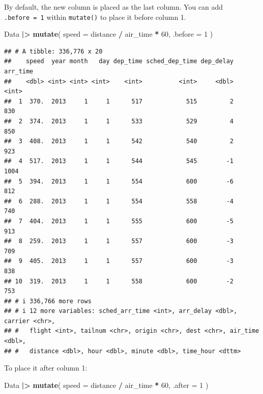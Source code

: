 \documentclass[
]{book}
\newenvironment{Shaded}{\begin{snugshade}}{\end{snugshade}}
\newcommand{\AttributeTok}[1]{\textcolor[rgb]{0.13,0.29,0.53}{#1}}
\newcommand{\DecValTok}[1]{\textcolor[rgb]{0.00,0.00,0.81}{#1}}
\newcommand{\FunctionTok}[1]{\textcolor[rgb]{0.13,0.29,0.53}{\textbf{#1}}}
\newcommand{\NormalTok}[1]{#1}
\newcommand{\SpecialCharTok}[1]{\textcolor[rgb]{0.81,0.36,0.00}{\textbf{#1}}}
\theoremstyle{definition}
\theoremstyle{definition}
\theoremstyle{definition}
\theoremstyle{definition}
\theoremstyle{remark}
\begin{document}
By default, the new column is placed as the last column. You can add \texttt{.before\ =\ 1} within \texttt{mutate()} to place it before column 1.

\begin{Shaded}
\begin{Highlighting}[]
\NormalTok{Data }\SpecialCharTok{|\textgreater{}} 
  \FunctionTok{mutate}\NormalTok{(}
    \AttributeTok{speed =}\NormalTok{ distance }\SpecialCharTok{/}\NormalTok{ air\_time }\SpecialCharTok{*} \DecValTok{60}\NormalTok{,}
    \AttributeTok{.before =} \DecValTok{1}
\NormalTok{  )}
\end{Highlighting}
\end{Shaded}

\begin{verbatim}
## # A tibble: 336,776 x 20
##    speed  year month   day dep_time sched_dep_time dep_delay arr_time
##    <dbl> <int> <int> <int>    <int>          <int>     <dbl>    <int>
##  1  370.  2013     1     1      517            515         2      830
##  2  374.  2013     1     1      533            529         4      850
##  3  408.  2013     1     1      542            540         2      923
##  4  517.  2013     1     1      544            545        -1     1004
##  5  394.  2013     1     1      554            600        -6      812
##  6  288.  2013     1     1      554            558        -4      740
##  7  404.  2013     1     1      555            600        -5      913
##  8  259.  2013     1     1      557            600        -3      709
##  9  405.  2013     1     1      557            600        -3      838
## 10  319.  2013     1     1      558            600        -2      753
## # i 336,766 more rows
## # i 12 more variables: sched_arr_time <int>, arr_delay <dbl>, carrier <chr>,
## #   flight <int>, tailnum <chr>, origin <chr>, dest <chr>, air_time <dbl>,
## #   distance <dbl>, hour <dbl>, minute <dbl>, time_hour <dttm>
\end{verbatim}

To place it after column 1:

\begin{Shaded}
\begin{Highlighting}[]
\NormalTok{Data }\SpecialCharTok{|\textgreater{}} 
  \FunctionTok{mutate}\NormalTok{(}
    \AttributeTok{speed =}\NormalTok{ distance }\SpecialCharTok{/}\NormalTok{ air\_time }\SpecialCharTok{*} \DecValTok{60}\NormalTok{,}
    \AttributeTok{.after =} \DecValTok{1}
\NormalTok{  )}
\end{Highlighting}
\end{Shaded}
\end{document}
